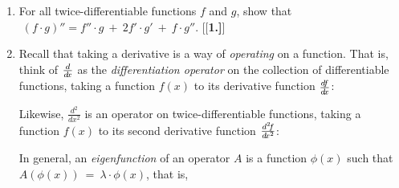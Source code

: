 {\begin{enumerate}[\bfseries 1.]
 moving along a straight line, then show that:
\begin{alignat*}{2}
 s' ~\text{and}~ s'' ~&\text{have the same sign} \quad&&\Rightarrow\quad \text{the object is accelerating}\\
 s' ~\text{and}~ s'' ~&\text{have opposite signs} &&\Rightarrow\quad \text{the object is decelerating}
\end{alignat*}
 \item For all twice-differentiable functions $f$ and $g$, show that
  $\;(f \cdot g)'' = f'' \cdot g ~+~ 2 f' \cdot g' ~+~ f \cdot g''$.
[{[\bfseries 1.]}]
 \item Recall that taking a derivative is a way of
 \emph{operating} on a function. That is, think of $\frac{d}{d\!x}$ as the
 \emph{differentiation operator} on the collection of differentiable functions,
 taking a function $f(x)$ to its derivative function $\frac{d\negmedspace f}{d\!x}$:
 \begin{center}
 \end{center}
  Likewise, $\frac{d^2}{d\!x^2}$ is an operator on twice-differentiable
  functions, taking a function $f(x)$ to its second derivative function
  $\frac{d^2 \negmedspace f}{d\!x^2}$:
 \begin{center}
 \end{center}
  In general, an \emph{eigenfunction} of an operator $A$ is a function
  $\phi(x)$ such that $A(\phi(x)) ~=~ \lambda \cdot \phi(x)$, that is,
 \begin{center}
\end{center}
\end{enumerate}}

